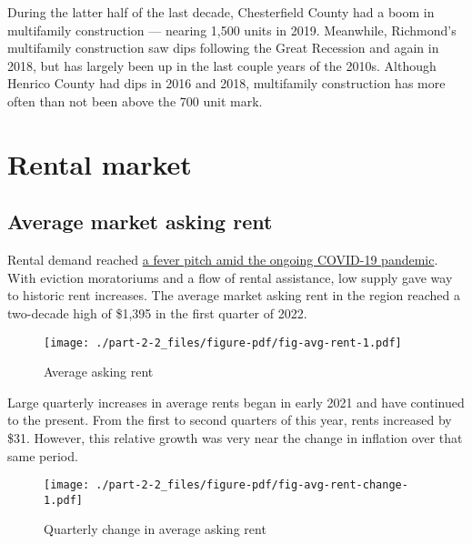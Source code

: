 \documentclass[
  letterpaper,
  DIV=11,
  numbers=noendperiod]{scrreprt}
\begin{document}
During the latter half of the last decade, Chesterfield County had a
boom in multifamily construction --- nearing 1,500 units in 2019.
Meanwhile, Richmond's multifamily construction saw dips following the
Great Recession and again in 2018, but has largely been up in the last
couple years of the 2010s. Although Henrico County had dips in 2016 and
2018, multifamily construction has more often than not been above the
700 unit mark.

\hypertarget{rental-market}{%
\section{Rental market}\label{rental-market}}

\hypertarget{average-market-asking-rent}{%
\subsection{Average market asking
rent}\label{average-market-asking-rent}}

Rental demand reached
\href{https://richmond.com/news/local/rent-in-richmond-region-surged-during-the-pandemic-two-bedroom-apartments-average-1-340-a/article_751d018b-b5b4-5592-9582-9e825bda674b.html}{a
fever pitch amid the ongoing COVID-19 pandemic}. With eviction
moratoriums and a flow of rental assistance, low supply gave way to
historic rent increases. The average market asking rent in the region
reached a two-decade high of \$1,395 in the first quarter of 2022.

\begin{figure}

{\centering \texttt{[image: ./part-2-2\_files/figure-pdf/fig-avg-rent-1.pdf]}

}

\caption{\label{fig-avg-rent}Average asking rent}

\end{figure}

Large quarterly increases in average rents began in early 2021 and have
continued to the present. From the first to second quarters of this
year, rents increased by \$31. However, this relative growth was very
near the change in inflation over that same period.

\begin{figure}

{\centering \texttt{[image: ./part-2-2\_files/figure-pdf/fig-avg-rent-change-1.pdf]}

}

\caption{\label{fig-avg-rent-change}Quarterly change in average asking
rent}

\end{figure}
\end{document}
